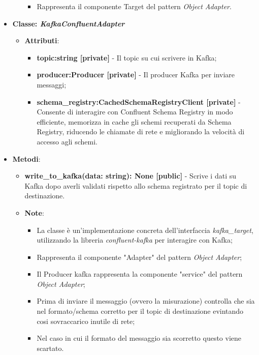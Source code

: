 \begin{itemize}
\begin{itemize}
\begin{itemize}
            \item Rappresenta il componente Target del pattern \textit{Object Adapter}.
        \end{itemize}
    \end{itemize}
    \item{\textbf{Classe: \textit{KafkaConfluentAdapter}}}
    \begin{itemize}
        \item\textbf{Attributi}:
        \begin{itemize}
            \item \textbf{topic:string [private]} - Il topic su cui scrivere in Kafka;
            \item \textbf{producer:Producer [private]} - Il producer Kafka per inviare messaggi;
            \item \textbf{schema\_registry:CachedSchemaRegistryClient [private]} - Consente di interagire con Confluent Schema Registry in modo efficiente, memorizza in cache gli schemi recuperati da Schema Registry, riducendo le chiamate di rete e migliorando la velocità di accesso agli schemi.
        \end{itemize}
    \end{itemize}
    \item \textbf{Metodi}:
    \begin{itemize}
        \item \textbf{write\_to\_kafka(data: string): None [public]} - Scrive i dati su Kafka dopo averli validati rispetto allo schema registrato per il topic di destinazione.
    \item\textbf{Note}:
        \begin{itemize}
            \item La classe è un'implementazione concreta dell'interfaccia \textit{kafka\_target}, utilizzando la libreria \textit{confluent-kafka} per interagire con Kafka;
            \item Rappresenta il componente "Adapter" del pattern \textit{Object Adapter};
            \item Il Producer kafka rappresenta la componente "service" del pattern \textit{Object Adapter};
            \item Prima di inviare il messaggio (ovvero la misurazione) controlla che sia nel formato/schema corretto per il topic di destinazione evintando cosi sovraccarico inutile di rete;
            \item Nel caso in cui il formato del messaggio sia scorretto questo viene scartato.
        \end{itemize}
    \end{itemize}
\end{itemize}

